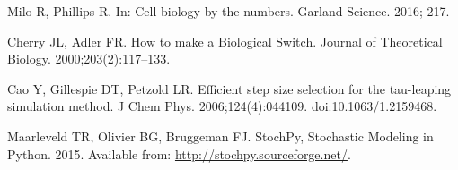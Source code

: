 \documentclass[10pt,letterpaper]{article}
\begin{document}
\begin{thebibliography}{10}
		Milo R, Phillips R.
		\newblock In: Cell biology by the numbers. Garland Science. 2016; 217.
		
		Cherry JL, Adler FR.
		\newblock How to make a Biological Switch.
		\newblock Journal of Theoretical Biology. 2000;203(2):117--133.
		
		Cao Y, Gillespie DT, Petzold LR.
		\newblock Efficient step size selection for the tau-leaping simulation method.
		\newblock J Chem Phys. 2006;124(4):044109.
		\newblock doi:{10.1063/1.2159468}.
		
		Maarleveld TR, Olivier BG, Bruggeman FJ. StochPy, Stochastic Modeling in
		Python. 2015.
		\newblock Available from: \url{http://stochpy.sourceforge.net/}.
		
	\end{thebibliography}
	
\end{document}
